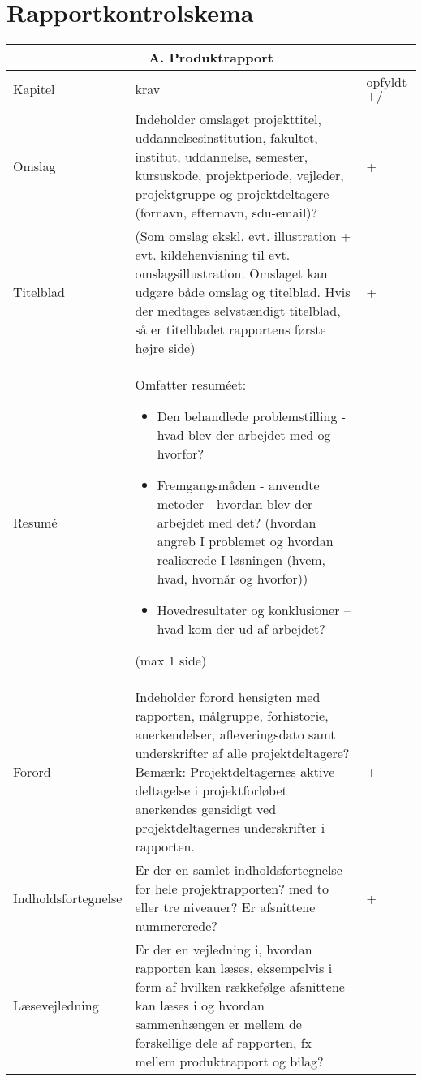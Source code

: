 \section{Rapportkontrolskema}
\begin{center}
\begin{longtable}{|m{3.5cm}|m{10cm}|m{2.5cm}|}
\hline
\multicolumn{3}{|c|}{A. Produktrapport} \\
\hline
Kapitel & krav & opfyldt $+/-$ \\ \hline
Omslag & Indeholder omslaget projekttitel, uddannelsesinstitution, fakultet, institut, uddannelse, semester, kursuskode, projektperiode, vejleder, projektgruppe og projektdeltagere (fornavn, efternavn, sdu-email)? & + \\
\hline
Titelblad & (Som omslag ekskl. evt. illustration + evt. kildehenvisning til evt. omslagsillustration. Omslaget kan udgøre både omslag og titelblad. Hvis der medtages selvstændigt titelblad, så er titelbladet rapportens første højre side) & + \\
\hline
Resumé & 
Omfatter resuméet:
\begin{itemize}
\item Den behandlede problemstilling - hvad blev der arbejdet med og hvorfor?
\item Fremgangsmåden - anvendte metoder - hvordan blev der arbejdet med det? 
(hvordan angreb I problemet og hvordan realiserede I løsningen (hvem, hvad, hvornår og hvorfor))
\item Hovedresultater og konklusioner  – hvad kom der ud af arbejdet?
\end{itemize}
(max  1 side)& \\
\hline
Forord & Indeholder forord hensigten med rapporten, målgruppe, forhistorie, anerkendelser, afleveringsdato samt underskrifter af alle projektdeltagere? \newline
Bemærk: Projektdeltagernes aktive deltagelse i projektforløbet anerkendes gensidigt ved projektdeltagernes underskrifter i rapporten. & +\\
\hline
Indholdsfortegnelse & Er der en samlet indholdsfortegnelse for hele projektrapporten? 
\newline med to eller tre niveauer?
\newline Er afsnittene nummererede? & + \\
\hline
Læsevejledning & Er der en vejledning i, hvordan rapporten kan læses, eksempelvis i form af hvilken rækkefølge afsnittene kan læses i og hvordan sammenhængen er mellem de forskellige dele af rapporten, fx mellem produktrapport og bilag? 

\end{longtable}
\end{center}
